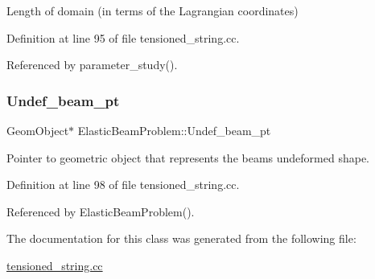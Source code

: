 Length of domain (in terms of the Lagrangian coordinates) 



Definition at line 95 of file tensioned\+\_\+string.\+cc.



Referenced by parameter\+\_\+study().

\mbox{\label{classElasticBeamProblem_a134a789cae77ab61a3e32bd93b28e1fa}} 
\subsubsection{\texorpdfstring{Undef\+\_\+beam\+\_\+pt}{Undef\_beam\_pt}}
{\footnotesize\ttfamily Geom\+Object$\ast$ Elastic\+Beam\+Problem\+::\+Undef\+\_\+beam\+\_\+pt\hspace{0.3cm}{\ttfamily [private]}}



Pointer to geometric object that represents the beam\textquotesingle{}s undeformed shape. 



Definition at line 98 of file tensioned\+\_\+string.\+cc.



Referenced by Elastic\+Beam\+Problem().



The documentation for this class was generated from the following file\+:\begin{DoxyCompactItemize}
\item 
\hyperlink{tensioned__string_8cc}{tensioned\+\_\+string.\+cc}\end{DoxyCompactItemize}
